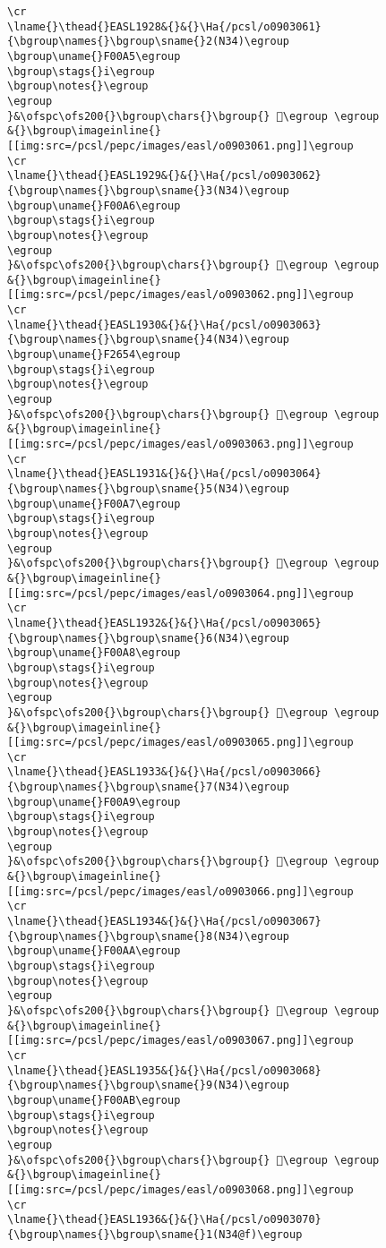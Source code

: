 \begin{verbatim}
\cr
\lname{}\thead{}EASL1928&{}&{}\Ha{/pcsl/o0903061}{\bgroup\names{}\bgroup\sname{}2(N34)\egroup
\bgroup\uname{}F00A5\egroup
\bgroup\stags{}i\egroup
\bgroup\notes{}\egroup
\egroup
}&\ofspc\ofs200{}\bgroup\chars{}\bgroup{} 󰂥\egroup \egroup
&{}\bgroup\imageinline{}[[img:src=/pcsl/pepc/images/easl/o0903061.png]]\egroup
\cr
\lname{}\thead{}EASL1929&{}&{}\Ha{/pcsl/o0903062}{\bgroup\names{}\bgroup\sname{}3(N34)\egroup
\bgroup\uname{}F00A6\egroup
\bgroup\stags{}i\egroup
\bgroup\notes{}\egroup
\egroup
}&\ofspc\ofs200{}\bgroup\chars{}\bgroup{} 󰂦\egroup \egroup
&{}\bgroup\imageinline{}[[img:src=/pcsl/pepc/images/easl/o0903062.png]]\egroup
\cr
\lname{}\thead{}EASL1930&{}&{}\Ha{/pcsl/o0903063}{\bgroup\names{}\bgroup\sname{}4(N34)\egroup
\bgroup\uname{}F2654\egroup
\bgroup\stags{}i\egroup
\bgroup\notes{}\egroup
\egroup
}&\ofspc\ofs200{}\bgroup\chars{}\bgroup{} 󲙔\egroup \egroup
&{}\bgroup\imageinline{}[[img:src=/pcsl/pepc/images/easl/o0903063.png]]\egroup
\cr
\lname{}\thead{}EASL1931&{}&{}\Ha{/pcsl/o0903064}{\bgroup\names{}\bgroup\sname{}5(N34)\egroup
\bgroup\uname{}F00A7\egroup
\bgroup\stags{}i\egroup
\bgroup\notes{}\egroup
\egroup
}&\ofspc\ofs200{}\bgroup\chars{}\bgroup{} 󰂧\egroup \egroup
&{}\bgroup\imageinline{}[[img:src=/pcsl/pepc/images/easl/o0903064.png]]\egroup
\cr
\lname{}\thead{}EASL1932&{}&{}\Ha{/pcsl/o0903065}{\bgroup\names{}\bgroup\sname{}6(N34)\egroup
\bgroup\uname{}F00A8\egroup
\bgroup\stags{}i\egroup
\bgroup\notes{}\egroup
\egroup
}&\ofspc\ofs200{}\bgroup\chars{}\bgroup{} 󰂨\egroup \egroup
&{}\bgroup\imageinline{}[[img:src=/pcsl/pepc/images/easl/o0903065.png]]\egroup
\cr
\lname{}\thead{}EASL1933&{}&{}\Ha{/pcsl/o0903066}{\bgroup\names{}\bgroup\sname{}7(N34)\egroup
\bgroup\uname{}F00A9\egroup
\bgroup\stags{}i\egroup
\bgroup\notes{}\egroup
\egroup
}&\ofspc\ofs200{}\bgroup\chars{}\bgroup{} 󰂩\egroup \egroup
&{}\bgroup\imageinline{}[[img:src=/pcsl/pepc/images/easl/o0903066.png]]\egroup
\cr
\lname{}\thead{}EASL1934&{}&{}\Ha{/pcsl/o0903067}{\bgroup\names{}\bgroup\sname{}8(N34)\egroup
\bgroup\uname{}F00AA\egroup
\bgroup\stags{}i\egroup
\bgroup\notes{}\egroup
\egroup
}&\ofspc\ofs200{}\bgroup\chars{}\bgroup{} 󰂪\egroup \egroup
&{}\bgroup\imageinline{}[[img:src=/pcsl/pepc/images/easl/o0903067.png]]\egroup
\cr
\lname{}\thead{}EASL1935&{}&{}\Ha{/pcsl/o0903068}{\bgroup\names{}\bgroup\sname{}9(N34)\egroup
\bgroup\uname{}F00AB\egroup
\bgroup\stags{}i\egroup
\bgroup\notes{}\egroup
\egroup
}&\ofspc\ofs200{}\bgroup\chars{}\bgroup{} 󰂫\egroup \egroup
&{}\bgroup\imageinline{}[[img:src=/pcsl/pepc/images/easl/o0903068.png]]\egroup
\cr
\lname{}\thead{}EASL1936&{}&{}\Ha{/pcsl/o0903070}{\bgroup\names{}\bgroup\sname{}1(N34@f)\egroup

\end{verbatim}
